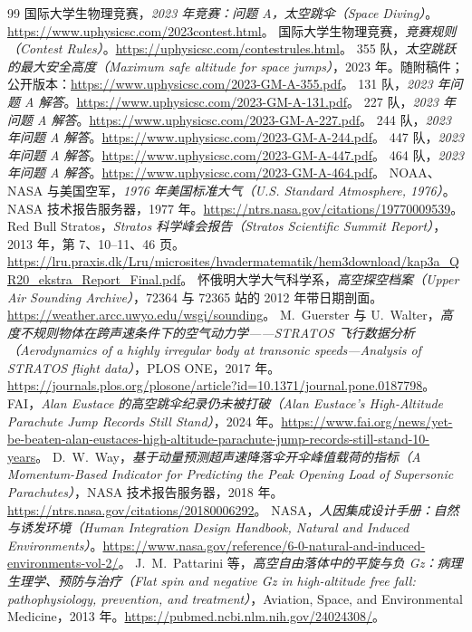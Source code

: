\documentclass[11pt,a4paper]{article}
\begin{document}
\begin{thebibliography}{99}\small
{} 国际大学生物理竞赛，\emph{2023 年竞赛：问题 A，太空跳伞（Space Diving）}。\url{https://www.uphysicsc.com/2023contest.html}。
 国际大学生物理竞赛，\emph{竞赛规则（Contest Rules）}。\url{https://uphysicsc.com/contestrules.html}。
 355 队，\emph{太空跳跃的最大安全高度（Maximum safe altitude for space jumps）}，2023 年。随附稿件；公开版本：\url{https://www.uphysicsc.com/2023-GM-A-355.pdf}。
 131 队，\emph{2023 年问题 A 解答}。\url{https://www.uphysicsc.com/2023-GM-A-131.pdf}。
 227 队，\emph{2023 年问题 A 解答}。\url{https://www.uphysicsc.com/2023-GM-A-227.pdf}。
 244 队，\emph{2023 年问题 A 解答}。\url{https://www.uphysicsc.com/2023-GM-A-244.pdf}。
 447 队，\emph{2023 年问题 A 解答}。\url{https://www.uphysicsc.com/2023-GM-A-447.pdf}。
 464 队，\emph{2023 年问题 A 解答}。\url{https://www.uphysicsc.com/2023-GM-A-464.pdf}。
 NOAA、NASA 与美国空军，\emph{1976 年美国标准大气（U.S. Standard Atmosphere, 1976）}。NASA 技术报告服务器，1977 年。\url{https://ntrs.nasa.gov/citations/19770009539}。
 Red Bull Stratos，\emph{Stratos 科学峰会报告（Stratos Scientific Summit Report）}，2013 年，第 7、10--11、46 页。\url{https://lru.praxis.dk/Lru/microsites/hvadermatematik/hem3download/kap3a_QR20_ekstra_Report_Final.pdf}。
 怀俄明大学大气科学系，\emph{高空探空档案（Upper Air Sounding Archive）}，72364 与 72365 站的 2012 年带日期剖面。\url{https://weather.arcc.uwyo.edu/wsgi/sounding}。
 M.~Guerster 与 U.~Walter，\emph{高度不规则物体在跨声速条件下的空气动力学——STRATOS 飞行数据分析（Aerodynamics of a highly irregular body at transonic speeds---Analysis of STRATOS flight data）}，PLOS ONE，2017 年。\url{https://journals.plos.org/plosone/article?id=10.1371/journal.pone.0187798}。
 FAI，\emph{Alan Eustace 的高空跳伞纪录仍未被打破（Alan Eustace's High-Altitude Parachute Jump Records Still Stand）}，2024 年。\url{https://www.fai.org/news/yet-be-beaten-alan-eustaces-high-altitude-parachute-jump-records-still-stand-10-years}。
 D.~W.~Way，\emph{基于动量预测超声速降落伞开伞峰值载荷的指标（A Momentum-Based Indicator for Predicting the Peak Opening Load of Supersonic Parachutes）}，NASA 技术报告服务器，2018 年。\url{https://ntrs.nasa.gov/citations/20180006292}。
 NASA，\emph{人因集成设计手册：自然与诱发环境（Human Integration Design Handbook, Natural and Induced Environments）}。\url{https://www.nasa.gov/reference/6-0-natural-and-induced-environments-vol-2/}。
 J.~M.~Pattarini 等，\emph{高空自由落体中的平旋与负 Gz：病理生理学、预防与治疗（Flat spin and negative Gz in high-altitude free fall: pathophysiology, prevention, and treatment）}，Aviation, Space, and Environmental Medicine，2013 年。\url{https://pubmed.ncbi.nlm.nih.gov/24024308/}。
\end{thebibliography}
\end{document}
